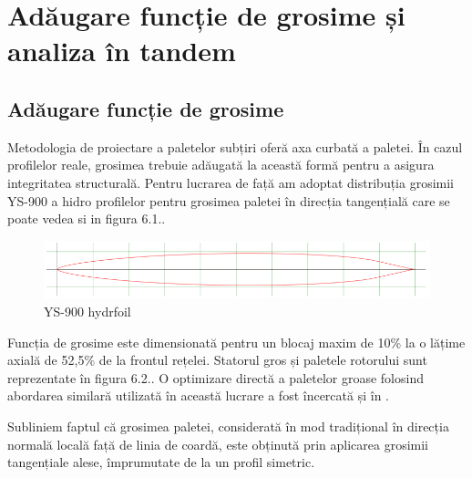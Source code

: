 \chapter{Adăugare funcție de grosime și analiza în tandem}\label{chapter:grosime}

\section{Adăugare funcție de grosime}

Metodologia de proiectare a paletelor subțiri oferă axa curbată a paletei. În cazul profilelor reale, grosimea trebuie adăugată la această formă pentru a asigura integritatea structurală. Pentru lucrarea de față am adoptat distribuția grosimii YS-900 a hidro profilelor \cite{eppler1979wing} pentru grosimea paletei în direcția tangențială care se poate vedea si in figura 6.1..

\begin{figure}[h]
	\centering
	\includegraphics[scale=0.5]{figures/airfoil-YS-900.png}
	\caption{YS-900 hydrfoil \cite{http://airfoiltools.com/airfoil/details?airfoil=ys900-il}}
	\label{YS-900 hydrfoil}
\end{figure}

Funcția de grosime este dimensionată pentru un blocaj maxim de 10\% la o lățime axială de 52,5\% de la frontul rețelei. Statorul gros și paletele rotorului sunt reprezentate în figura 6.2.. O optimizare directă a paletelor groase folosind abordarea similară utilizată în această lucrare a fost încercată și în \cite{frunzua2010optimization}.

Subliniem faptul că grosimea paletei, considerată în mod tradițional în direcția normală locală față de linia de coardă, este obținută prin aplicarea grosimii tangențiale alese, împrumutate de la un profil simetric.

